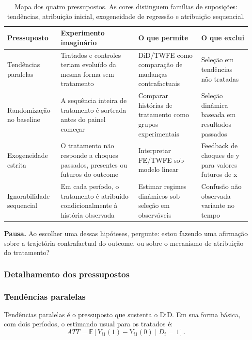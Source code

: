 \documentclass[
]{article}
\begin{document}
\begin{table}

\caption{\label{tab:pressupostos-matriz}Mapa dos quatro pressupostos. As cores distinguem famílias de suposições: tendências, atribuição inicial, exogeneidade de regressão e atribuição sequencial.}
\centering
\begin{tabular}[t]{l|l|l|l}
\hline
Pressuposto & Experimento imaginário & O que permite & O que exclui\\
\hline
Tendências paralelas & Tratados e controles teriam evoluído da mesma forma sem tratamento & DiD/TWFE como comparação de mudanças contrafactuais & Seleção em tendências não tratadas\\
\hline
Randomização no baseline & A sequência inteira de tratamento é sorteada antes do painel começar & Comparar histórias de tratamento como grupos experimentais & Seleção dinâmica baseada em resultados passados\\
\hline
Exogeneidade estrita & O tratamento não responde a choques passados, presentes ou futuros do outcome & Interpretar FE/TWFE sob modelo linear & Feedback de choques de y para valores futuros de x\\
\hline
Ignorabilidade sequencial & Em cada período, o tratamento é atribuído condicionalmente à história observada & Estimar regimes dinâmicos sob seleção em observáveis & Confusão não observada variante no tempo\\
\hline
\end{tabular}
\end{table}

\textbf{Pausa.} Ao escolher uma dessas hipóteses, pergunte: estou fazendo uma afirmação sobre a trajetória contrafactual do outcome, ou sobre o mecanismo de atribuição do tratamento?

\subsubsection{Detalhamento dos pressupostos}\label{detalhamento-dos-pressupostos}

\subsubsection{Tendências paralelas}\label{tenduxeancias-paralelas-1}

Tendências paralelas é o pressuposto que sustenta o DiD. Em sua forma básica, com dois períodos, o estimando usual para os tratados é:
\[
ATT = \mathbb{E}[Y_{i1}(1)-Y_{i1}(0)\mid D_i=1].
\]
\end{document}
